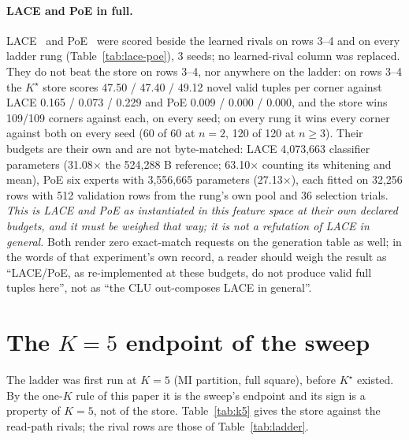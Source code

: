 \documentclass{article} %
\newcommand{\Kstar}{\ensuremath{K^{\star}}}
\begin{document}
\paragraph{LACE and PoE in full.}
LACE~\citep{nie2021controllable} and PoE~\citep{hinton2002training} were scored beside the
learned rivals on rows 3--4 and on every ladder rung (Table~\ref{tab:lace-poe}), 3 seeds; no
learned-rival column was replaced. They do not beat the
store on rows 3--4, nor anywhere on the ladder: on rows 3--4 the $\Kstar$ store scores 47.50 / %
47.40 / 49.12 novel valid tuples per corner against LACE 0.165 / 0.073 / 0.229 and PoE 0.009 / %
0.000 / 0.000, and the store wins 109/109 corners against each, on every seed; on every rung it %
wins every corner against both on every seed (60 of 60 at $n=2$, 120 of 120 at $n\ge3$). %
Their budgets are their own and are not byte-matched: LACE 4,073,663 classifier parameters %
(31.08$\times$ the 524,288 B reference; 63.10$\times$ counting its whitening and mean), PoE six %
experts with 3,556,665 parameters (27.13$\times$), each fitted on 32,256 rows with 512 validation %
rows from the rung's own pool and 36 selection trials. %
\emph{This is LACE and PoE as instantiated in this feature space at their own declared budgets,
and it must be weighed that way; it is not a refutation of LACE in general.} Both render zero
exact-match requests on the generation table as well; in the words of that experiment's own record, a
reader should weigh the result as ``LACE/PoE, as re-implemented at these budgets, do not produce
valid full tuples here'', not as ``the CLU out-composes LACE in general''. %


\section{The $K=5$ endpoint of the sweep}
\label{app:k5}

The ladder was first run at $K=5$ (MI partition, full square), before $\Kstar$ existed. By the
one-$K$ rule of this paper it is the sweep's endpoint and its sign is a property of $K=5$, not of the store.
Table~\ref{tab:k5} gives the store against the read-path rivals; the rival rows are those of
Table~\ref{tab:ladder}.
\end{document}
